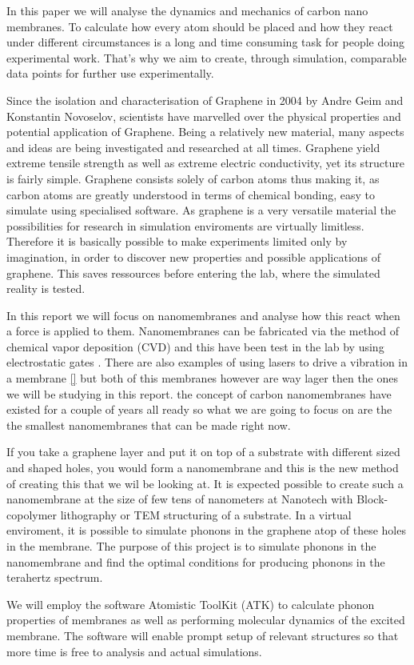 
In this paper we will analyse the dynamics and mechanics of carbon nano membranes. To calculate how every atom should be placed and how they react under different circumstances is a long and time consuming task for people doing experimental work. That's why we aim to create, through simulation, comparable data points for further use experimentally.

Since the isolation and characterisation of
Graphene in 2004 by Andre Geim and
Konstantin Novoselov, scientists have marvelled over the physical properties and potential
application of Graphene. Being a relatively new material, many aspects and ideas are being
investigated and researched at all times. Graphene yield extreme tensile strength as well as
extreme electric conductivity, yet its structure is fairly simple. Graphene consists solely of
carbon atoms thus making it, as carbon atoms are greatly understood in terms of chemical
bonding, easy to simulate using specialised software. As graphene is a very versatile
material the possibilities for research in simulation enviroments are virtually limitless.
Therefore it is basically possible to make experiments limited only by imagination, in order
to discover new properties and possible applications of graphene. This saves ressources
before entering the lab, where the simulated reality is tested.

In this report we will focus on nanomembranes and analyse how this react when a force is applied to them. Nanomembranes can be fabricated via the method of chemical vapor deposition (CVD) and this have been test in the lab by using electrostatic gates \cite{Zande2010}. There are also examples of using lasers to drive a vibration in a membrane \ref{} but both of this membranes however are way lager then the ones we will be studying in this report. the concept of carbon nanomembranes have existed for a couple of years all ready so what we are going to focus on are the the smallest nanomembranes that can be made right now.

If you take a graphene layer and put it on top of a substrate with different sized and shaped holes, you would
form a nanomembrane and this is the new method of creating this that we wil be looking at. It is expected possible to create such a nanomembrane at the
size of few tens of nanometers at Nanotech with Block-copolymer lithography or TEM
structuring of a substrate. In a virtual enviroment, it is possible to simulate phonons
in the graphene atop of these holes in the membrane. The purpose of this project is to
simulate phonons in the nanomembrane and find the optimal conditions for producing
phonons in the terahertz spectrum.

We will employ the software Atomistic ToolKit (ATK) to calculate phonon properties
of membranes as well as performing molecular dynamics of the excited membrane. The
software will enable prompt setup of relevant structures so that more time is free to analysis
and actual simulations.
